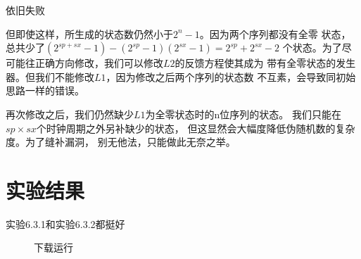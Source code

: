 \documentclass[12pt,a4paper,UTF8]{article}
\begin{document}
{\noindent{\makebox[1em]{\textbullet}}\textsf{依旧失败}}

但即使这样，所生成的状态数仍然小于$2^n-1$。因为两个序列都没有全零
状态，总共少了$(2^{sp+sx}-1)-(2^{sp}-1)(2^{sx}-1)=2^{sp}+2^{sx}-2$
个状态。为了尽可能往正确方向修改，我们可以修改$L2$的反馈方程使其成为
带有全零状态的发生器。但我们不能修改$L1$，因为修改之后两个序列的状态数
不互素，会导致同初始思路一样的错误。

再次修改之后，我们仍然缺少$L1$为全零状态时的n位序列的状态。
我们只能在$sp\times sx$个时钟周期之外另补缺少的状态，
但这显然会大幅度降低伪随机数的复杂度。为了缝补漏洞，
别无他法，只能做此无奈之举。

\section{实验结果}
实验6.3.1和实验6.3.2都挺好

\begin{figure}[H]
  \centering
  \caption{下载运行}
  \label{fpga}
\end{figure}
\end{document}
